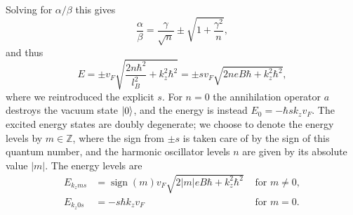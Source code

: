 Solving for $\alpha /\beta $ this gives
\begin{equation}
  \frac{\alpha}{\beta } = \frac{\gamma}{\sqrt{n}} \pm \sqrt{1 + \frac{\gamma^2}{n}},
\end{equation}
and thus
\begin{equation}
  E = \pm v_F \sqrt{
    \frac{2n \hbar ^2}{l_B^2} + k_z^2\hbar ^2
  }
  = \pm s v_F \sqrt{
    2n e B \hbar + k_z^2\hbar ^2
  },
\end{equation}
where we reintroduced the explicit $s$.
For $n = 0$ the annihilation operator $a$ destroys the vacuum state $\ket{0}$, and the energy is instead $E_0 = -\hbar s k_z v_F$.
The excited energy states are doubly degenerate;
we choose to denote the energy levels by $m \in \mathbb{Z}$, where the sign from $\pm s$ is taken care of by the sign of this quantum number, and the harmonic oscillator levels $n$ are given by its absolute value $|m|$.
The energy levels are
\begin{align}
  E_{k_z m s} &= \operatorname{sign}(m) v_F \sqrt{2 |m| e B \hbar  + k_z^2 \hbar ^2} & \text{ for } m \neq 0,\\
E_{k_z 0 s} &= -s \hbar k_z v_F & \text{ for } m = 0.
\end{align}

